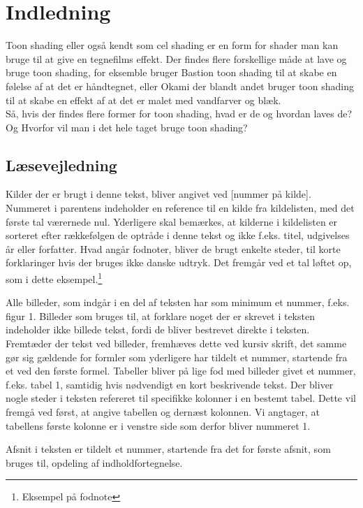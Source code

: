 \section*{Indledning}
\thispagestyle{empty}
Toon shading eller også kendt som cel shading er en form for shader man kan bruge til at give en tegnefilms effekt. Der findes flere forskellige måde at lave og bruge toon shading, for eksemble bruger Bastion toon shading til at skabe en følelse af at det er håndtegnet, eller Okami der blandt andet bruger toon shading til at skabe en effekt af at det er malet med vandfarver og blæk.
\\
Så, hvis der findes flere former for toon shading, hvad er de og hvordan laves de? Og Hvorfor vil man i det hele taget bruge toon shading?
\\

\subsection*{Læsevejledning}
Kilder der er brugt i denne tekst, bliver angivet ved [nummer på kilde]. 
Nummeret i parentens indeholder en reference til en kilde fra kildelisten, med det første tal værernede nul. 
Yderligere skal bemærkes, at kilderne i kildelisten er sorteret efter rækkefølgen de optråde i denne tekst og ikke f.eks. titel, udgivelses år eller forfatter. 
Hvad angår fodnoter, bliver de brugt enkelte steder, til korte forklaringer hvis der bruges ikke danske udtryk. Det fremgår ved et tal løftet op, som i dette eksempel.\footnote[1]{Eksempel på fodnote}  

Alle billeder, som indgår i en del af teksten har som minimum et nummer, f.eks. figur 1. Billeder som bruges til, at forklare noget der er skrevet i teksten indeholder ikke
billede tekst, fordi de bliver bestrevet direkte i teksten. Fremtæder der tekst ved billeder, fremhæves dette ved kursiv skrift, det samme gør sig gældende for formler som
yderligere har tildelt et nummer, startende fra et ved den første formel. Tabeller bliver på lige fod med billeder givet et nummer, f.eks. tabel 1, samtidig hvis nødvendigt en kort beskrivende tekst. Der bliver nogle steder i teksten refereret til specifikke kolonner i en bestemt tabel. Dette vil fremgå ved først, at angive tabellen og dernæst kolonnen. Vi angtager, at tabellens første kolonne er i venstre side som derfor bliver nummeret 1. 

Afsnit i teksten er tildelt et nummer, startende fra det for første afsnit, som bruges til, opdeling af indholdfortegnelse. 
